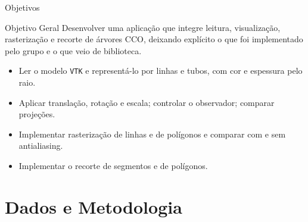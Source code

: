 \documentclass[aspectratio=169,11pt]{beamer}
\begin{document}
\begin{frame}{Objetivos}
\begin{block}{Objetivo Geral}
Desenvolver uma aplicação que integre leitura, visualização, rasterização e recorte de árvores CCO, deixando explícito o que foi implementado pelo grupo e o que veio de biblioteca.
\end{block}

\vspace{0.25cm}

\begin{itemize}
  \item Ler o modelo \texttt{VTK} e representá-lo por linhas e tubos, com cor e espessura pelo raio.
  \item Aplicar translação, rotação e escala; controlar o observador; comparar projeções.
  \item Implementar rasterização de linhas e de polígonos e comparar com e sem antialiasing.
  \item Implementar o recorte de segmentos e de polígonos.
\end{itemize}
\end{frame}

\section{Dados e Metodologia}
\end{document}
